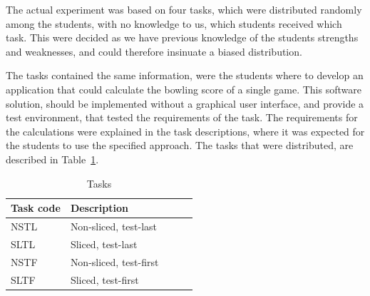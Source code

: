 \documentclass{sig-alternate-05-2015}
\begin{document}
The actual experiment was based on four tasks, which were distributed randomly among the students, with no know\-ledge to us, which students received which task. This were decided as we have previous knowledge of the students strengths and weaknesses, and could therefore insinuate a biased distribution.

The tasks contained the same information, were the students where to develop an application that could calculate the bow\-ling score of a single game. This software solution, should be implemented without a graphical user interface, and provide a test environment, that tested the requirements of the task. The requirements for the calculations were explained in the task descriptions, where it was expected for the students to use the specified approach.
The tasks that were distributed, are described in Table~\ref{TaskTable}.

\begin{table}[!ht]
\centering
\caption{Tasks}
\label{TaskTable}
\begin{tabular}{|l|p{0.68\linewidth}|}
\hline
\textbf{Task code} & \textbf{Description} \\
\hline
\hline
NSTL & Non-sliced, test-last \\
SLTL & Sliced, test-last \\
NSTF & Non-sliced, test-first \\
SLTF & Sliced, test-first\\
\hline
\end{tabular}
\end{table}
\end{document}
